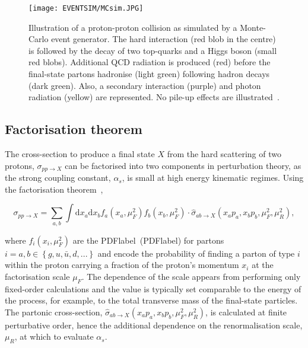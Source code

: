 \begin{figure}[htbp]
    \RawFloats
    \begin{center}
    \texttt{[image: EVENTSIM/MCsim.JPG]}
    \caption{
        Illustration of a proton-proton collision as simulated by a Monte-Carlo event generator. The hard interaction (red blob in the centre) is followed by the decay of two top-quarks and a Higgs boson (small red blobs). Additional QCD radiation is produced (red) before the final-state partons hadronise (light green) following hadron decays (dark green). Also, a secondary interaction (purple) and photon radiation (yellow) are represented. No pile-up effects are illustrated~\cite{Gleisberg_2009}. 
    }
    \label{figEVNTSIM:MCsim}
    \end{center}
\end{figure}

\clearpage

\subsection{Factorisation theorem}

The cross-section to produce a final state $X$ from the hard scattering of two protons, $\sigma_{pp\to X}$ can be factorised into two components in perturbation theory, as the strong coupling constant, $\alpha_s$, is small at high energy kinematic regimes. Using the factorisation theorem~\cite{Factorisation},

\begin{equation}
    \sigma_{pp\to X}=\sum_{a,b}\int \text{d}x_a\text{d}x_b f_a(x_a,\mu_F^2)f_b(x_b,\mu_F^2)\cdot\hat{\sigma}_{ab\to X}(x_a p_a,x_b p_b,\mu_F^2,\mu_R^2),
\end{equation}

where $f_i(x_i,\mu_F^2)$ are the \acrlong{PDFlabel}~(\acrshort{PDFlabel}) for partons $i=a,b\in\left\{g, u, \bar{u}, d, ...\right\}$ and encode the probability of finding a parton of type $i$ within the proton carrying a fraction of the proton's momentum $x_i$ at the factorisation scale $\mu_F$. The dependence of the scale appears from performing only fixed-order calculations and the value is typically set comparable to the energy of the process, for example, to the total transverse mass of the final-state particles. The partonic cross-section, $\hat{\sigma}_{ab\to X}(x_a p_a,x_b p_b,\mu_F^2,\mu_R^2)$, is calculated at finite perturbative order, hence the additional dependence on the renormalisation scale, $\mu_R$, at which to evaluate $\alpha_s$.


